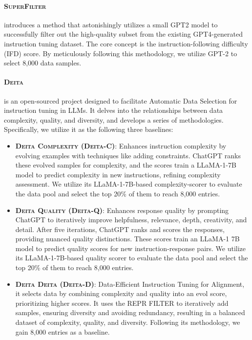 \paragraph{\textsc{SuperFilter~\cite{li2024super}}} introduces a method that astonishingly utilizes a small GPT2 model to successfully filter out the high-quality subset from the existing GPT4-generated instruction tuning dataset. The core concept is the instruction-following difficulty (IFD) score. By meticulously following this methodology, we utilize GPT-2 to select 8,000 data samples.

\paragraph{\textsc{Deita~\cite{liu2023deita}}} is an open-sourced project designed to facilitate Automatic Data Selection for instruction tuning in LLMs. It delves into the relationships between data complexity, quality, and diversity, and develops a series of methodologies. Specifically, we utilize it as the following three baselines:

\begin{itemize}
    \item \textbf{\textsc{Deita Complexity (Deita-C)}}: Enhances instruction complexity by evolving examples with techniques like adding constraints. ChatGPT ranks these evolved samples for complexity, and the scores train a LLaMA-1-7B model to predict complexity in new instructions, refining complexity assessment. We utilize its LLaMA-1-7B-based complexity-scorer to evaluate the data pool and select the top 20\% of them to reach 8,000 entries.
    \item \textbf{\textsc{Deita Quality (Deita-Q)}}: Enhances response quality by prompting ChatGPT to iteratively improve helpfulness, relevance, depth, creativity, and detail. After five iterations, ChatGPT ranks and scores the responses, providing nuanced quality distinctions. These scores train an LLaMA-1 7B model to predict quality scores for new instruction-response pairs. We utilize its LLaMA-1-7B-based quality scorer to evaluate the data pool and select the top 20\% of them to reach 8,000 entries.
    \item \textbf{\textsc{Deita Deita (Deita-D)}}: Data-Efficient Instruction Tuning for Alignment, it selects data by combining complexity and quality into an evol score, prioritizing higher scores. It uses the REPR FILTER to iteratively add samples, ensuring diversity and avoiding redundancy, resulting in a balanced dataset of complexity, quality, and diversity. Following its methodology, we gain 8,000 entries as a baseline.
\end{itemize}

